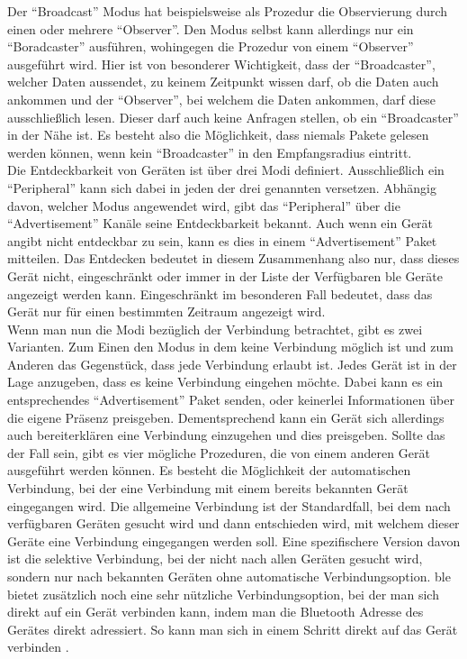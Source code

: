 \noindent Der "`Broadcast"' Modus hat beispielsweise als Prozedur die Observierung durch einen oder mehrere "`Observer"'. Den Modus selbst kann allerdings nur ein "`Boradcaster"' ausführen, wohingegen die Prozedur von einem "`Observer"' ausgeführt wird. Hier ist von besonderer Wichtigkeit, dass der "`Broadcaster"', welcher Daten aussendet, zu keinem Zeitpunkt wissen darf, ob die Daten auch ankommen und der "`Observer"', bei welchem die Daten ankommen, darf diese ausschließlich lesen. Dieser darf auch keine Anfragen stellen, ob ein "`Broadcaster"' in der Nähe ist. Es besteht also die Möglichkeit, dass niemals Pakete gelesen werden können, wenn kein "`Broadcaster"' in den Empfangsradius eintritt.\\

\noindent Die Entdeckbarkeit von Geräten ist über drei Modi definiert. Ausschließlich ein "`Peripheral"' kann sich dabei in jeden der drei genannten versetzen. Abhängig davon, welcher Modus angewendet wird, gibt das "`Peripheral"' über die "`Advertisement"' Kanäle seine Entdeckbarkeit bekannt. Auch wenn ein Gerät angibt nicht entdeckbar zu sein, kann es dies in einem "`Advertisement"' Paket mitteilen. Das Entdecken bedeutet in diesem Zusammenhang also nur, dass dieses Gerät nicht, eingeschränkt oder immer in der Liste der Verfügbaren \ac{ble} Geräte angezeigt werden kann. Eingeschränkt im besonderen Fall bedeutet, dass das Gerät nur für einen bestimmten Zeitraum angezeigt wird.\\

\noindent Wenn man nun die Modi bezüglich der Verbindung betrachtet, gibt es zwei Varianten. Zum Einen den Modus in dem keine Verbindung möglich ist und zum Anderen das Gegenstück, dass jede Verbindung erlaubt ist. Jedes Gerät ist in der Lage anzugeben, dass es keine Verbindung eingehen möchte. Dabei kann es ein entsprechendes "`Advertisement"' Paket senden, oder keinerlei Informationen über die eigene Präsenz preisgeben. Dementsprechend kann ein Gerät sich allerdings auch bereiterklären eine Verbindung einzugehen und dies preisgeben. Sollte das der Fall sein, gibt es vier mögliche Prozeduren, die von einem anderen Gerät ausgeführt werden können. Es besteht die Möglichkeit der automatischen Verbindung, bei der eine Verbindung mit einem bereits bekannten Gerät eingegangen wird. Die allgemeine Verbindung ist der Standardfall, bei dem nach verfügbaren Geräten gesucht wird und dann entschieden wird, mit welchem dieser Geräte eine Verbindung eingegangen werden soll. Eine spezifischere Version davon ist die selektive Verbindung, bei der nicht nach allen Geräten gesucht wird, sondern nur nach bekannten Geräten ohne automatische Verbindungsoption. \ac{ble} bietet zusätzlich noch eine sehr nützliche Verbindungsoption, bei der man sich direkt auf ein Gerät verbinden kann, indem man die Bluetooth Adresse des Gerätes direkt adressiert. So kann man sich in einem Schritt direkt auf das Gerät verbinden \cite[Seite 38ff]{Townsend14:GSB}.\\      

